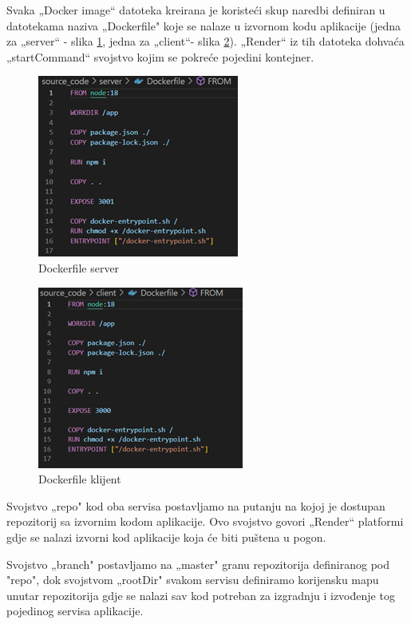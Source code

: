 Svaka „Docker image“ datoteka kreirana je koristeći skup naredbi definiran u datotekama naziva „Dockerfile" koje se nalaze u izvornom kodu aplikacije (jedna za „server“ - slika \ref{fig:ServerDoc}, jedna za „client“- slika \ref{fig:ClientDoc}). „Render“ iz tih datoteka dohvaća „startCommand“ svojstvo kojim se pokreće pojedini kontejner. 
\begin{figure}[H]
			\includegraphics[scale=0.9]{slike/Slika5.PNG} %
			\centering
			\caption{Dockerfile server}
			\label{fig:ServerDoc}
			
		\end{figure}
\begin{figure}[H]
			\includegraphics[scale=0.9]{slike/Slika6.PNG} %
			\centering
			\caption{Dockerfile klijent}
			\label{fig:ClientDoc}
		\end{figure}
Svojstvo „repo" kod oba servisa postavljamo na putanju na kojoj je dostupan repozitorij sa izvornim kodom aplikacije. Ovo svojstvo govori „Render“ platformi gdje se nalazi izvorni kod aplikacije koja će biti puštena u pogon.

Svojstvo „branch" postavljamo na „master" granu repozitorija definiranog pod "repo", dok svojstvom „rootDir" svakom servisu definiramo korijensku mapu unutar repozitorija gdje se nalazi sav kod potreban za izgradnju i izvođenje tog pojedinog servisa aplikacije. 

